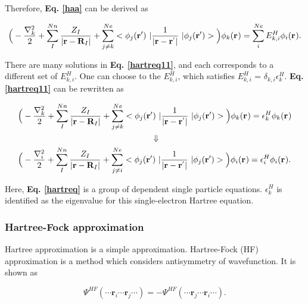 \documentclass[a4paper, 12pt, titlepage,oneside,drop]{kthesis}
\begin{document}
Therefore, \textbf{Eq. \ref{haa}} can be derived as 

\begin{equation}\label{hartreq11}
\Big(-\frac{\nabla^{2}_{k}}{2} + \sum\limits_I^{{Nn}} \frac{Z_{I}}{|\textbf{r}-\textbf{R}_{I}|} + \sum\limits_{j \neq k}^{{Ne}}  <\bwfn<j><'>\ | \frac{1}{|\textbf{r} - \textbf{r}^{'} |} \ | \bwfn<j><'>>\Big) \bwff<k><> = \sum\limits_i^{{Ne}} E_{k,i}^{H} \bwff<i><>.
\end{equation}

There are many solutions in \textbf{Eq. \ref{hartreq11}}, and each corresponds to a different set of $E_{k,i}^{H}$. One can choose to the $E_{k,i}^{H}$, which satisfies $E_{k,i}^{H}$ = $\delta_{k,i}\epsilon_k^{{H}}$.
\textbf{Eq. \ref{hartreq11}} can be rewritten as

\begin{equation}\begin{split}\label{hartreq}
& \Big(-\frac{\nabla^{2}_{k}}{2} + \sum\limits_I^{{Nn}} \frac{Z_{I}}{|\textbf{r}-\textbf{R}_{I}|} + \sum\limits_{j \neq k}^{{Ne}}  <\bwfn<j><'>\ | \frac{1}{|\textbf{r} - \textbf{r}^{'} |} \ | \bwfn<j><'>>\Big) \bwff<k><> = \epsilon_k^{{H}} \bwff<k><>  \\
&  \qquad \qquad \qquad  \qquad \qquad \qquad \qquad \qquad  \Downarrow  \\
& \Big(-\frac{\nabla^{2}_{i}}{2} + \sum\limits_I^{{Nn}} \frac{Z_{I}}{|\textbf{r}-\textbf{R}_{I}|} + \sum\limits_{j \neq i}^{{Ne}}  <\bwfn<j><'>\ | \frac{1}{|\textbf{r} - \textbf{r}^{'} |} \ | \bwfn<j><'>>\Big) \bwff<i><> = \epsilon_i^{{H}} \bwff<i><>.  \\
\end{split}
\end{equation}


Here, \textbf{Eq. \ref{hartreq}} is a group of dependent single particle equations. $\epsilon_k^{{H}}$ is identified as the eigenvalue for this single-electron Hartree equation.

\subsubsection{Hartree-Fock approximation}
Hartree approximation is a simple approximation. Hartree-Fock (HF) approximation is a method which considers antisymmetry of wavefunction. It is shown as

\begin{equation}\label{hfwf}
\Psi^{HF} ( \cdots \textbf{r}_{i} \cdots  \textbf{r}_{j} \cdots ) = - \Psi^{HF} ( \cdots \textbf{r}_{j} \cdots  \textbf{r}_{i} \cdots).
\end{equation}
\end{document}
